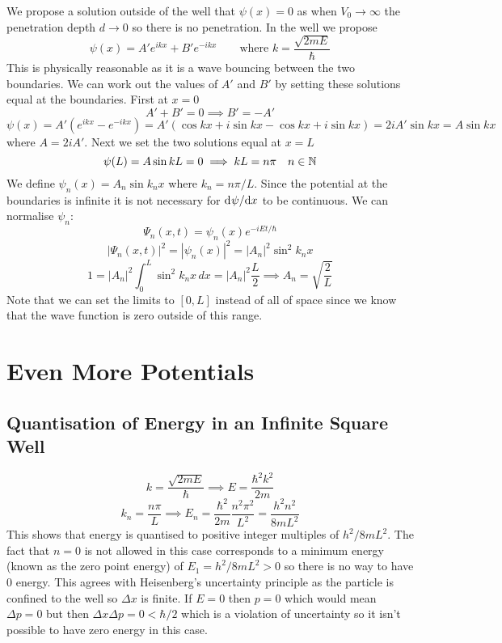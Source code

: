 \documentclass{article}
\begin{document}
    We propose a solution outside of the well that \(\psi(x) = 0\) as when \(V_0\to\infty\) the penetration depth \(d\to 0\) so there is no penetration.
    In the well we propose
    \[\psi(x) = A'e^{ikx} + B'e^{-ikx}\qquad\text{where } k = \frac{\sqrt{2mE}}{\hbar}\]
    This is physically reasonable as it is a wave bouncing between the two boundaries.
    We can work out the values of \(A'\) and \(B'\) by setting these solutions equal at the boundaries. First at \(x = 0\)
    \[A' + B' = 0\implies B' = -A'\]
    \[\psi(x) = A'(e^{ikx} - e^{-ikx}) = A'(\cos kx + i\sin kx - \cos kx + i\sin kx) = 2iA'\sin kx = A\sin kx\]
    where \(A = 2iA'\).
    Next we set the two solutions equal at \(x = L\)
    \[\psi(L) = A\sin kL = 0 \implies kL = n\pi \quad n\in\mathbb{N}\]
    We define \(\psi_n(x) = A_n\sin k_nx\) where \(k_n = n\pi/L\).
    Since the potential at the boundaries is infinite it is not necessary for \(\mathrm{d}^{}{\psi}/\mathrm{d}{x}^{}\) to be continuous.
    We can normalise \(\psi_n\):
    \[\Psi_n(x, t) = \psi_n(x)e^{-iEt/\hbar}\]
    \[|\Psi_n(x, t)|^2 = |\psi_n(x)|^2 = |A_n|^2\sin^2 k_nx\]
    \[1 = |A_n|^2 \int_0^L \sin^2 k_nx\,dx = |A_n|^2\frac{L}{2} \implies A_n = \sqrt{\frac{2}{L}}\]
    Note that we can set the limits to \([0, L]\) instead of all of space since we know that the wave function is zero outside of this range.
    
    \section{Even More Potentials}
    \subsection{Quantisation of Energy in an Infinite Square Well}
    \[k = \frac{\sqrt{2mE}}{\hbar} \implies E = \frac{\hbar^2k^2}{2m}\]
    \[k_n = \frac{n\pi}{L} \implies E_n = \frac{\hbar^2}{2m}\frac{n^2\pi^2}{L^2} = \frac{h^2n^2}{8mL^2}\]
    This shows that energy is quantised to positive integer multiples of \(h^2/8mL^2\).
    The fact that \(n = 0\) is not allowed in this case corresponds to a minimum energy (known as the zero point energy) of \(E_1 = h^2/8mL^2 > 0\) so there is no way to have 0 energy.
    This agrees with Heisenberg's uncertainty principle as the particle is confined to the well so \(\Delta x\) is finite.
    If \(E = 0\) then \(p = 0\) which would mean \(\Delta p = 0\) but then \(\Delta x\Delta p = 0 < \hbar/2\) which is a violation of uncertainty so it isn't possible to have zero energy in this case.
    
\end{document}
